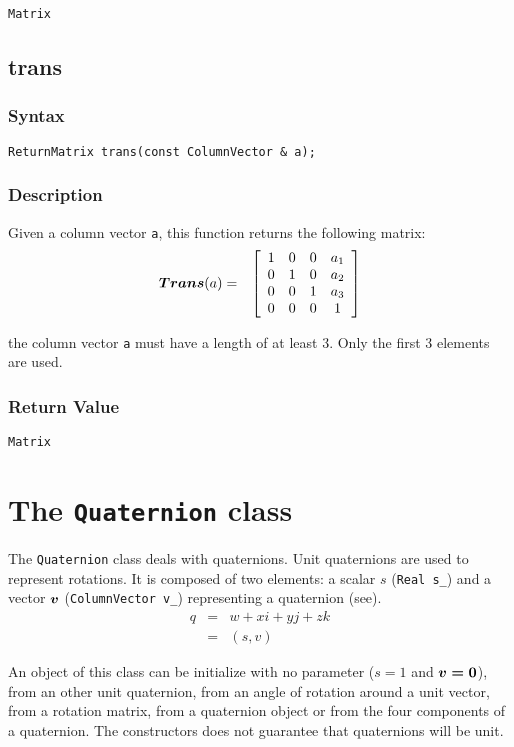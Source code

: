 \documentclass[dvips,11pt,fleqn]{report}
\newcommand{\mbold}[1]{\mbox{\boldmath $ #1 $}}
\newcommand{\matr}[2]{\left[\begin{array}{#1} #2 \end{array}\right]}
\begin{document}
{\tt Matrix}

\newpage

\subsection*{trans}

\subsubsection*{Syntax}
\begin{verbatim}
ReturnMatrix trans(const ColumnVector & a);
\end{verbatim}
\subsubsection{Description}
Given a column vector {\tt a}, this function returns the following matrix:
\begin{eqnarray}
\mbold{Trans}(a) & = & 
\matr{cccc}{
1 & 0 & 0 & a_1 \\
0 & 1 & 0 & a_2 \\
0 & 0 & 1 & a_3 \\
0 & 0 & 0 & 1
}
\end{eqnarray}

 the column vector {\tt a} must have a length of at least 3. 
Only the first 3 elements are used.

\subsubsection*{Return Value}

{\tt Matrix}

\newpage

\section{The \texttt{Quaternion} class}

The \texttt{Quaternion} class deals with quaternions. Unit quaternions
are used to represent rotations. It is composed of two elements: a
scalar $s$ (\texttt{Real s\_}) and a vector $\mbold{v}$
(\texttt{ColumnVector v\_}) representing a quaternion
(see\cite{Chou92}).
\begin{eqnarray}
 q & = & w + xi + yj + zk \\
   & = & (s, v) 
\end{eqnarray}

An object of this class can be initialize with no parameter ($s=1$ and
$\mbold{v=0}$), from an other unit quaternion, from an angle of
rotation around a unit vector, from a rotation matrix, from a
quaternion object or from the four components of a quaternion. The
constructors does not guarantee that quaternions will be unit.
\end{document}
